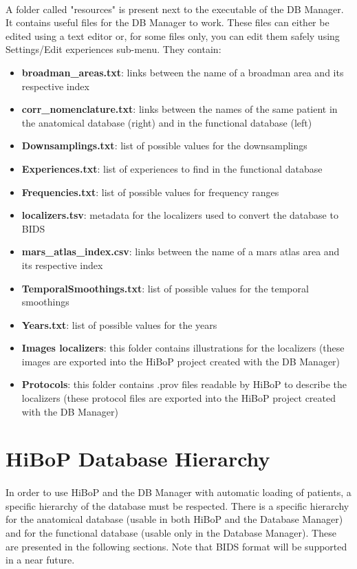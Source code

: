 \documentclass[a4paper]{article}
\begin{document}
\paragraph{} A folder called "resources" is present next to the executable of the DB Manager. It contains useful files for the DB Manager to work. These files can either be edited using a text editor or, for some files only, you can edit them safely using Settings/Edit experiences sub-menu. They contain:
\begin{itemize}
\item \textbf{broadman\_areas.txt}: links between the name of a broadman area and its respective index
\item \textbf{corr\_nomenclature.txt}: links between the names of the same patient in the anatomical database (right) and in the functional database (left)
\item \textbf{Downsamplings.txt}: list of possible values for the downsamplings
\item \textbf{Experiences.txt}: list of experiences to find in the functional database
\item \textbf{Frequencies.txt}: list of possible values for frequency ranges
\item \textbf{localizers.tsv}: metadata for the localizers used to convert the database to BIDS
\item \textbf{mars\_atlas\_index.csv}: links between the name of a mars atlas area and its respective index
\item \textbf{TemporalSmoothings.txt}: list of possible values for the temporal smoothings
\item \textbf{Years.txt}: list of possible values for the years
\item \textbf{Images localizers}: this folder contains illustrations for the localizers (these images are exported into the HiBoP project created with the DB Manager)
\item \textbf{Protocols}: this folder contains .prov files readable by HiBoP to describe the localizers (these protocol files are exported into the HiBoP project created with the DB Manager)
\end{itemize}
\section{HiBoP Database Hierarchy}\label{bddhierarchy}
\paragraph{} In order to use HiBoP and the DB Manager with automatic loading of patients, a specific hierarchy of the database must be respected. There is a specific hierarchy for the anatomical database (usable in both HiBoP and the Database Manager) and for the functional database (usable only in the Database Manager). These are presented in the following sections. Note that BIDS format will be supported in a near future.
\end{document}
